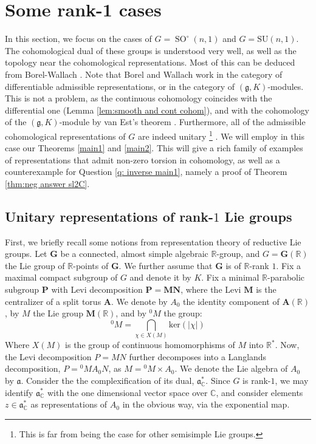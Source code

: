 \documentclass[12pt,reqno]{amsart}
\newcommand{\R}{\mathbb{R}}
\newcommand{\C}{\mathbb{C}}
\theoremstyle{definition}
\newcommand{\SO}{\operatorname{SO}}
\newcommand{\abs}[1]{\left| #1 \right|}
\begin{document}
\section{Some rank-1 cases}\label{sec6}
In this section, we focus on the cases of $G=\SO^\circ(n,1)$ and $G=\mathrm{SU}(n,1)$. The cohomological dual of these groups is understood very well, as well as the topology near the cohomological representations. Most of this can be deduced from Borel-Wallach \cite[Section~VI.4]{BorelWallach}. Note that Borel and Wallach work in the category of differentiable admissible representations, or in the category of $(\mathfrak{g},K)$-modules. This is not a problem, as the continuous cohomology coincides with the differential one (Lemma \ref{lem:smooth and cont cohom}), and with the cohomology of the $(\mathfrak{g}, K)$-module by van Est's theorem \cite[Corollary~IX.5.6.ii]{BorelWallach}. Furthermore, all of the admissible cohomological representations of $G$ are indeed unitary \footnote{This is far from being the case for other semisimple Lie groups.} \cite[Theorem~VI.4.12]{BorelWallach}. We will employ in this case our Theorems \ref{main1} and \ref{main2}. This will give a rich family of examples of representations that admit non-zero torsion in cohomology, as well as a counterexample for Question \ref{q: inverse main1}, namely a proof of Theorem \ref{thm:neg answer sl2C}.

\subsection{Unitary representations of rank-$1$ Lie groups}\label{subsec:6.1} First, we briefly recall some notions from representation theory of reductive Lie groups. Let $\mathbf{G}$ be a connected, almost simple algebraic $\mathbb{R}$-group, and $G=\mathbf{G}(\mathbb{R})$ the Lie group of $\mathbb{R}$-points of $\mathbf{G}$. We further assume that $\mathbf{G}$ is of $\R$-rank $1$. Fix a maximal compact subgroup of $G$ and denote it by $K$. Fix a minimal $\R$-parabolic subgroup $\mathbf{P}$ with Levi decomposition $\mathbf{P}=\mathbf{MN}$, where the Levi $\mathbf{M}$ is the centralizer of a split torus $\mathbf{A}$. We denote by $A_0$ the identity component of $\mathbf{A}(\R)$, by $M$ the Lie group $\mathbf{M}(\R)$, and by $^0M$ the group:
$$^0M=\bigcap_{\chi \in X(M)} \mathrm{ker}(\abs{\chi})$$
Where $X(M)$ is the group of continuous homomorphisms of $M$ into $\mathbb{R}^*$. Now, the Levi decomposition $P=MN$ further decomposes into a Langlands decomposition, $P={^0M} A_0 N$, as $M = {^0M} \times A_0$. We denote the Lie algebra of $A_0$ by $\mathfrak{a}$. Consider the the complexification of its dual, $\mathfrak{a}_\mathbb{C}^*$. Since $G$ is rank-$1$, we may identify $\mathfrak{a}_\mathbb{C}^*$ with the one dimensional vector space over $\C$, and consider elements $z \in \mathfrak{a}_\mathbb{C}^*$ as representations of $A_0$ in the obvious way, via the exponential map.
\end{document}
